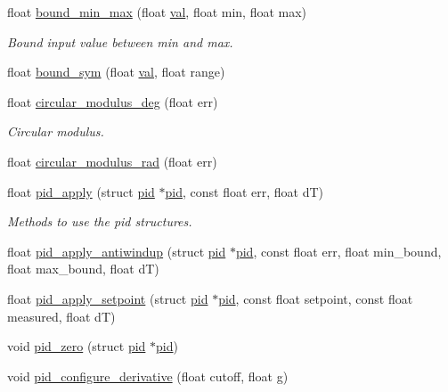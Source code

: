 \begin{DoxyCompactItemize}
float \hyperlink{group___tau_labs_math_gae7fa5c4383337339fe17371cd78d7264}{bound\-\_\-min\-\_\-max} (float \hyperlink{group___p_i_o_s___t_i_m_ga757344f09097232d715d55cbf9d61a43}{val}, float min, float max)
\begin{DoxyCompactList}\small\item\em \-Bound input value between min and max. \end{DoxyCompactList}\item 
float \hyperlink{group___tau_labs_math_gab53f96ff60025bfea084300f2cec575e}{bound\-\_\-sym} (float \hyperlink{group___p_i_o_s___t_i_m_ga757344f09097232d715d55cbf9d61a43}{val}, float range)
\item 
float \hyperlink{group___tau_labs_math_gab7dbfea1a0ae1bd6758c2cb07b278ebf}{circular\-\_\-modulus\-\_\-deg} (float err)
\begin{DoxyCompactList}\small\item\em \-Circular modulus. \end{DoxyCompactList}\item 
float \hyperlink{group___tau_labs_math_gaba90e72f0f9a03ff25411ec53f5d492b}{circular\-\_\-modulus\-\_\-rad} (float err)
\item 
float \hyperlink{group___tau_labs_math_gad03a357c11d4b4f48d0b53508c134172}{pid\-\_\-apply} (struct \hyperlink{structpid}{pid} $\ast$\hyperlink{structpid}{pid}, const float err, float d\-T)
\begin{DoxyCompactList}\small\item\em \-Methods to use the pid structures. \end{DoxyCompactList}\item 
float \hyperlink{group___tau_labs_math_gaf54d5f129b61126e45090a00f76a5e5f}{pid\-\_\-apply\-\_\-antiwindup} (struct \hyperlink{structpid}{pid} $\ast$\hyperlink{structpid}{pid}, const float err, float min\-\_\-bound, float max\-\_\-bound, float d\-T)
\item 
float \hyperlink{group___tau_labs_math_ga45b7c7ad39b81a853b97decfeed5e7c1}{pid\-\_\-apply\-\_\-setpoint} (struct \hyperlink{structpid}{pid} $\ast$\hyperlink{structpid}{pid}, const float setpoint, const float measured, float d\-T)
\item 
void \hyperlink{group___tau_labs_math_ga2e2dbc48e2b186b32beebd99e18f79e9}{pid\-\_\-zero} (struct \hyperlink{structpid}{pid} $\ast$\hyperlink{structpid}{pid})
\item 
void \hyperlink{group___tau_labs_math_ga90a5d55ff766104f2cf9b4f2cc28d60f}{pid\-\_\-configure\-\_\-derivative} (float cutoff, float g)

\end{DoxyCompactItemize}

